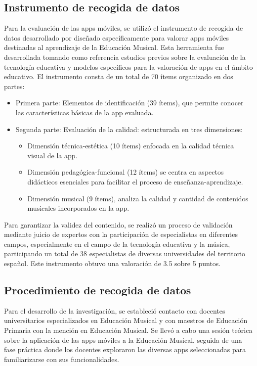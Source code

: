 \documentclass[spanish]{textolivre}
\begin{document}
\subsection{Instrumento de recogida de datos}\label{sec-2_1}
Para la evaluación de las apps móviles, se utilizó el instrumento de recogida de datos desarrollado por \textcite{leon-garrido2024} diseñado específicamente para valorar apps móviles destinadas al aprendizaje de la Educación Musical. Esta herramienta fue desarrollada tomando como referencia estudios previos sobre la evaluación de la tecnología educativa y modelos específicos para la valoración de apps en el ámbito educativo. El instrumento consta de un total de 70 ítems organizado en dos partes:

\begin{itemize}
    \item Primera parte: Elementos de identificación (39 ítems), que permite conocer las características básicas de la app evaluada.
    \item Segunda parte: Evaluación de la calidad: estructurada en tres dimensiones:
    \begin{itemize}
        \item Dimensión técnica-estética (10 ítems) enfocada en la calidad técnica visual de la app.
        \item Dimensión pedagógica-funcional (12 ítems) se centra en aspectos didácticos esenciales para facilitar el proceso de enseñanza-aprendizaje.
        \item Dimensión musical (9 ítems), analiza la calidad y cantidad de contenidos musicales incorporados en la app.
    \end{itemize}
\end{itemize}

Para garantizar la validez del contenido, se realizó un proceso de validación mediante juicio de expertos con la participación de especialistas en diferentes campos, especialmente en el campo de la tecnología educativa y la música, participando un total de 38 especialistas de diversas universidades del territorio español. Este instrumento obtuvo una valoración de 3.5 sobre 5 puntos.

\subsection{Procedimiento de recogida de datos}\label{sec-2_2}
Para el desarrollo de la investigación, se estableció contacto con docentes universitarios especializados en Educación Musical y con maestros de Educación Primaria con la mención en Educación Musical. Se llevó a cabo una sesión teórica sobre la aplicación de las apps móviles a la Educación Musical, seguida de una fase práctica donde los docentes exploraron las diversas apps seleccionadas para familiarizarse con sus funcionalidades.
\end{document}
